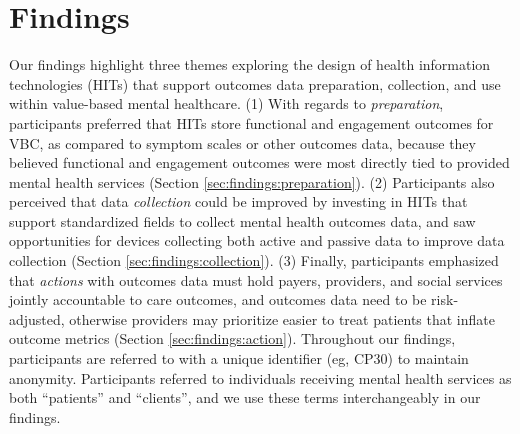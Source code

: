 \section{Findings}
\label{sec:findings}

Our findings highlight three themes exploring the design of health information technologies (HITs) that support outcomes data preparation, collection, and use within value-based mental healthcare.
(1) With regards to \textit{preparation}, participants preferred that HITs store functional and engagement outcomes for VBC, as compared to symptom scales or other outcomes data, because they believed functional and engagement outcomes were most directly tied to provided mental health services (Section \ref{sec:findings:preparation}).
(2) Participants also perceived that data \textit{collection} could be improved by investing in HITs that support standardized fields to collect mental health outcomes data, and saw opportunities for devices collecting both active and passive data to improve data collection (Section \ref{sec:findings:collection}).
(3) Finally, participants emphasized that \textit{actions} with outcomes data must hold payers, providers, and social services jointly accountable to care outcomes, and outcomes data need to be risk-adjusted, otherwise providers may prioritize easier to treat patients that inflate outcome metrics (Section \ref{sec:findings:action}).
Throughout our findings, participants are referred to with a unique identifier (eg, CP30) to maintain anonymity.
Participants referred to individuals receiving mental health services as both ``patients'' and ``clients'', and we use these terms interchangeably in our findings.




